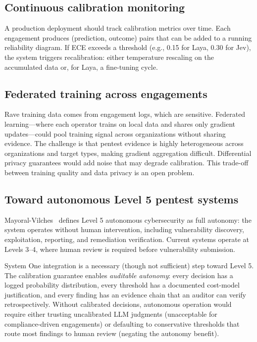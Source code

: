 \documentclass[conference]{IEEEtran}
\begin{document}
\subsection{Continuous calibration monitoring}

A production deployment should track calibration metrics over time. Each engagement produces (prediction, outcome) pairs that can be added to a running reliability diagram. If ECE exceeds a threshold (e.g., 0.15 for Laya, 0.30 for Jev), the system triggers recalibration: either temperature rescaling on the accumulated data or, for Laya, a fine-tuning cycle.

\subsection{Federated training across engagements}

Rave training data comes from engagement logs, which are sensitive. Federated learning---where each operator trains on local data and shares only gradient updates---could pool training signal across organizations without sharing evidence. The challenge is that pentest evidence is highly heterogeneous across organizations and target types, making gradient aggregation difficult. Differential privacy guarantees would add noise that may degrade calibration. This trade-off between training quality and data privacy is an open problem.

\subsection{Toward autonomous Level 5 pentest systems}

Mayoral-Vilches~\cite{mayoral2025gap} defines Level 5 autonomous cybersecurity as full autonomy: the system operates without human intervention, including vulnerability discovery, exploitation, reporting, and remediation verification. Current systems operate at Levels 3--4, where human review is required before vulnerability submission.

System One integration is a necessary (though not sufficient) step toward Level 5. The calibration guarantee enables \emph{auditable autonomy}: every decision has a logged probability distribution, every threshold has a documented cost-model justification, and every finding has an evidence chain that an auditor can verify retrospectively. Without calibrated decisions, autonomous operation would require either trusting uncalibrated LLM judgments (unacceptable for compliance-driven engagements) or defaulting to conservative thresholds that route most findings to human review (negating the autonomy benefit).
\end{document}
